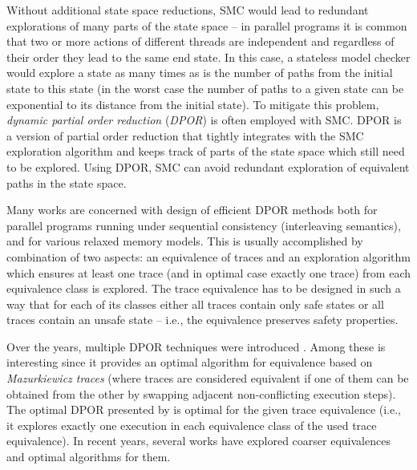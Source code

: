 Without additional state space reductions, SMC would lead to redundant
explorations of many parts of the state space -- in parallel programs it is
common that two or more actions of different threads are independent and
regardless of their order they lead to the same end state.
In this case, a stateless model checker would explore a state as many times as
is the number of paths from the initial state to this state (in the worst case
the number of paths to a given state can be exponential to its distance from
the initial state).
To mitigate this problem, \emph{dynamic partial order reduction}
(\emph{DPOR})  is often employed with SMC.
DPOR is a version of partial order reduction that tightly integrates with
the SMC exploration algorithm and keeps track of parts of the state space which
still need to be explored.
Using DPOR, SMC can avoid redundant exploration of equivalent paths in the
state space.

Many works are concerned with design of efficient DPOR methods both for
parallel programs running under sequential consistency (interleaving
semantics), and for various relaxed memory models.
This is usually accomplished by combination of two aspects: an equivalence of
traces and an exploration algorithm which ensures at least one trace (and in
optimal case exactly one trace) from each equivalence class is explored.
The trace equivalence has to be designed in such a way that for each of its
classes either all traces contain only safe states or all traces contain an
unsafe state -- i.e., the equivalence preserves safety properties.

Over the years, multiple DPOR techniques were introduced
.
Among these  is interesting since it provides an optimal algorithm for equivalence based on \emph{Mazurkiewicz traces}  (where traces are considered equivalent if one of them can be obtained from the other by swapping adjacent non-conflicting execution steps).
The optimal DPOR presented by  is optimal for the
given trace equivalence (i.e., it explores exactly one execution in each equivalence class of the used trace equivalence).
In recent years, several works have explored coarser equivalences and optimal algorithms for them.

